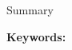 \begin{center}
\Large{Summary}
\end{center}

\bigskip


\bigskip
\bigskip
\bigskip

\textbf{Keywords:} %
